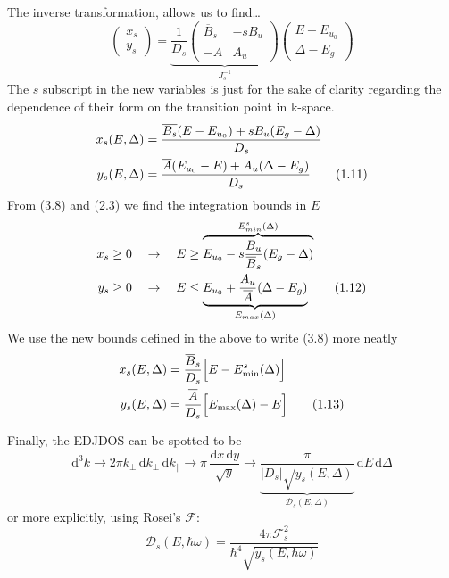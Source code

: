 \documentclass[11pt]{article}
\newcommand{\kperp}{k_{\perp}}
\newcommand{\kpar}{k_{\parallel}}
\newcommand{\hw}{\hbar\omega}
\newcommand{\Dc}{\mathcal{D}}
\newcommand{\Fc}{\mathcal{F}}
\begin{document}
The inverse transformation, allows us to find\ldots
\begin{equation}
\begin{pmatrix} x_{s} \\ y_{s} \end{pmatrix}
= \underbrace{\frac{1}{D_{s}}\begin{pmatrix} \overline{B}_{s} & -sB_u \\ -\overline{A} & A_u \end{pmatrix}}_{J_{s}^{-1}}
\begin{pmatrix} E - E_{u_0} \\ \Delta - E_g \end{pmatrix}
\tag{1.10}
\end{equation}
The $s$ subscript in the new variables is just for the sake of clarity regarding the dependence of their form on the transition point in k-space.
\begin{align}
x_{s}(E,\Delta) &= \frac{\overline{B_{s}}(E-E_{u_{0}})+sB_{u}(E_{g}-\Delta)}{D_{s}} \notag\\
y_{s}(E,\Delta) &= \frac{\overline{A}(E_{u_{0}}-E)+A_{u}(\Delta-E_{g})}{D_{s}}
\tag{1.11}
\end{align}
From (3.8) and (2.3) we find the integration bounds in $E$
\begin{align}
x_{s}&\geq 0 &&\to \quad E \geq \overbrace{E_{u_{0}} - s \frac{B_{u}}{\overline{B}_{s}}(E_{g}-\Delta)}^{E_{min}^{s}(\Delta)} \notag\\
y_{s}&\geq 0 &&\to \quad E \leq \underbrace{E_{u_{0}} + \frac{A_{u}}{\overline{A}}(\Delta-E_{g})}_{E_{max}(\Delta)}
\tag{1.12}
\end{align}
We use the new bounds defined in the above to write (3.8) more neatly
\begin{align}
x_{s}(E,\Delta) &= \frac{\overline{B}_{s}}{D_{s}}\Big[E-E_{\text{min}}^{s}(\Delta)\Big] \notag\\
y_{s}(E,\Delta) &= \frac{\overline{A}}{D_{s}}\Big[E_{\text{max}}(\Delta)-E\Big]
\tag{1.13}
\end{align}

Finally, the EDJDOS can be spotted to be
\begin{equation}
\mathrm{d}^{3}k \to 2\pi \kperp\, \mathrm{d}\kperp\, \mathrm{d}\kpar \to \pi\, \frac{\mathrm{d}x\,\mathrm{d}y}{\sqrt{y}} \to
\underbrace{\frac{\pi}{|D_{s}|\sqrt{y_{s}(E,\Delta)}}}_{\Dc_{s}(E,\Delta)}\, \mathrm{d}E\,\mathrm{d}\Delta
\tag{1.14}
\end{equation}
or more explicitly, using Rosei's $\Fc$:
\begin{equation}
\boxed{\Dc_{s}(E,\hw) = \frac{4\pi \Fc_{s}^{2}}{\hbar^{4}\sqrt{y_{s}(E,\hw)}}}
\tag{1.15}
\end{equation}
\end{document}

